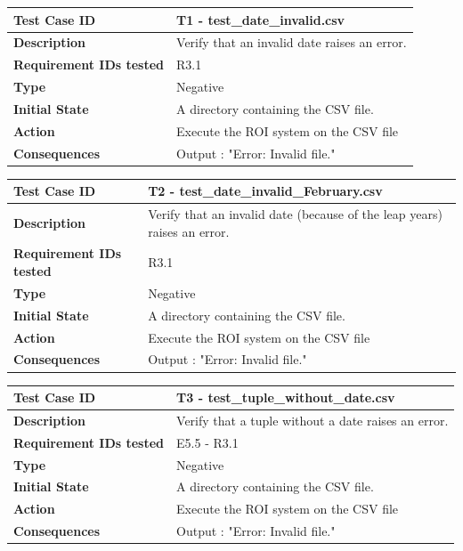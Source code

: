 \documentclass[runningheads,12pt]{article}
\begin{document}
\bigskip
{\centering
\begin{tabular}{|p{1.2in}|p{4in}|}
\hline
\textbf{Test Case ID} & T1 - test\_date\_invalid.csv \\ 
\hline
\textbf{Description} & Verify that an invalid date raises an error.\\
\hline
\textbf{Requirement IDs tested} & R3.1 \\ 
\hline
\textbf{Type} & Negative \\ 
\hline
\textbf{Initial State} & A directory containing the CSV file.\\
\hline 
\textbf{Action} & Execute the ROI system on the CSV file \\
\hline 
\textbf{Consequences} & Output : "Error: Invalid file." \\ 
\hline
\end{tabular}
\bigskip\bigskip
\centering
\begin{tabular}{|p{1.2in}|p{4in}|}
\hline
\textbf{Test Case ID} & T2 - test\_date\_invalid\_February.csv \\ 
\hline
\textbf{Description} & Verify that an invalid date (because of the leap years) raises an error.\\
\hline
\textbf{Requirement IDs tested} & R3.1 \\ 
\hline
\textbf{Type} & Negative \\ 
\hline
\textbf{Initial State} & A directory containing the CSV file.\\
\hline 
\textbf{Action} & Execute the ROI system on the CSV file \\
\hline 
\textbf{Consequences} & Output : "Error: Invalid file." \\ 
\hline
\end{tabular}
\bigskip
\centering
\begin{tabular}{|p{1.2in}|p{4in}|}
\hline
\textbf{Test Case ID} & T3 - test\_tuple\_without\_date.csv \\ 
\hline
\textbf{Description} & Verify that a tuple without a date raises an error.\\
\hline
\textbf{Requirement IDs tested} & E5.5 - R3.1 \\ 
\hline
\textbf{Type} & Negative \\ 
\hline
\textbf{Initial State} & A directory containing the CSV file.\\
\hline 
\textbf{Action} & Execute the ROI system on the CSV file \\
\hline 
\textbf{Consequences} & Output : "Error: Invalid file." \\ 

\end{tabular}}
\end{document}
